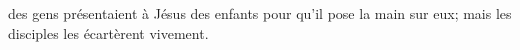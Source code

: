 \encetemps
	des gens présentaient à Jésus des enfants pour qu’il pose la main sur eux;
	mais les disciples les écartèrent vivement.
